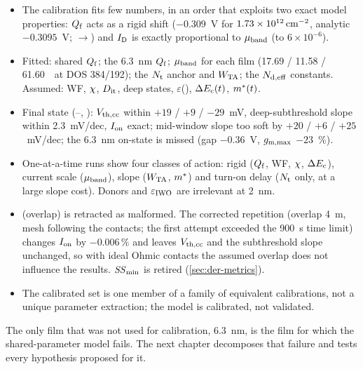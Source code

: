 \begin{keyresult}
\begin{itemize}
\item The calibration fits few numbers, in an order that exploits two exact model properties: $Q_{\mathrm{f}}$ acts as a rigid shift ($-0.309$~V for $1.73\times10^{12}\,\mathrm{cm}^{-2}$, analytic $-0.3095$~V; $\rightarrow$) and $I_{\mathrm{D}}$ is exactly proportional to $\mu_{\mathrm{band}}$ (to $6\times10^{-6}$).
\item Fitted: shared $Q_{\mathrm{f}}$; the 6.3~nm $Q_{\mathrm{f}}$; $\mu_{\mathrm{band}}$ for each film (17.69 / 11.58 / 61.60~\cmVs\ at DOS 384/192); the $N_{\mathrm{t}}$ anchor and $W_{\mathrm{TA}}$; the $N_{\mathrm{d,eff}}$ constants. Assumed: WF, $\chi$, $D_{\mathrm{it}}$, deep states, $\varepsilon$(\AlO), $\Delta E_{\mathrm{c}}(t)$, $m^{*}(t)$.
\item Final state (--, \evCAL): $V_{\mathrm{th,cc}}$ within $+19$ / $+9$ / $-29$~mV, deep-subthreshold slope within 2.3~mV/dec, $I_{\mathrm{on}}$ exact; mid-window slope too soft by $+20$ / $+6$ / $+25$~mV/dec; the 6.3~nm on-state is missed (gap $-0.36$~V, $g_{\mathrm{m,max}}$ $-23$~\%).
\item One-at-a-time runs show four classes of action: rigid ($Q_{\mathrm{f}}$, WF, $\chi$, $\Delta E_{\mathrm{c}}$), current scale ($\mu_{\mathrm{band}}$), slope ($W_{\mathrm{TA}}$, $m^{*}$) and turn-on delay ($N_{\mathrm{t}}$ only, at a large slope cost). Donors and $\varepsilon_{\mathrm{IWO}}$ are irrelevant at 2~nm.
\item {} (overlap) is retracted as malformed. The corrected repetition  (overlap 4~\textmu m, mesh following the contacts; the first attempt  exceeded the 900~s time limit) changes $I_{\mathrm{on}}$ by $-0.006\,\%$ and leaves $V_{\mathrm{th,cc}}$ and the subthreshold slope unchanged, so with ideal Ohmic contacts the assumed overlap does not influence the results. $\mathit{SS}_{\min}$ is retired (\cref{sec:der-metrics}).
\item The calibrated set is one member of a family of equivalent calibrations, not a unique parameter extraction; the model is calibrated, not validated.
\end{itemize}
\end{keyresult}

The only film that was not used for calibration, 6.3~nm, is the film for which the shared-parameter model fails. The next chapter decomposes that failure and tests every hypothesis proposed for it.
